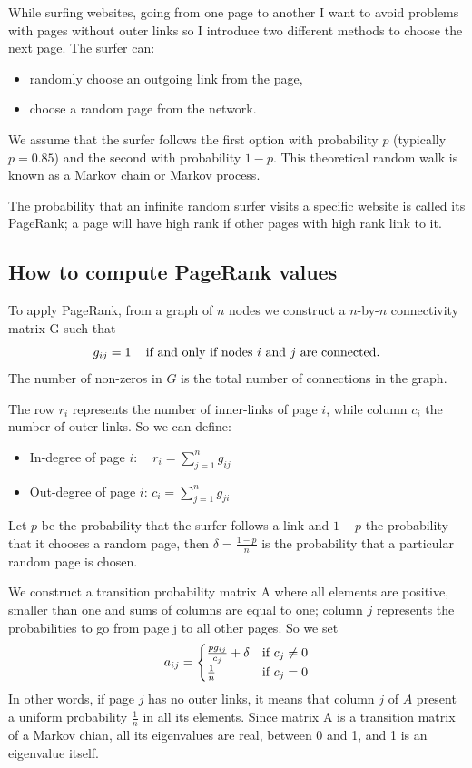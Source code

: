 \documentclass[]{usiinfbachelorproject}
\newcommand\tab[1][1cm]{\hspace*{#1}}
\begin{document}
While surfing websites, going from one page to another I want to avoid problems with pages without outer links so I introduce two different methods to choose the next page. The surfer can:
\begin{itemize}
\item randomly choose an outgoing link from the page,
\item choose a random page from the network.
\end{itemize}
We assume that the surfer follows the first option with probability $p$ (typically $p=0.85$) and the second with probability $1-p$. This theoretical random walk is known as a Markov chain or Markov process.

The probability that an infinite random surfer visits a specific website is called its PageRank; a page will have high rank if other pages with high rank link to it.


\subsection{How to compute PageRank values}
To apply PageRank, from a graph of $n$ nodes we construct a $n$-by-$n$ connectivity matrix G such that
\begin{equation*}
g_{ij}=1 \text{\;\;\; if and only if nodes $i$ and $j$ are connected.} 
\end{equation*}
The number of non-zeros in $G$ is the total number of connections in the graph.

The row $r_i$ represents the number of inner-links of page $i$, while column $c_i$ the number of outer-links. So we can define:
\begin{itemize}
\item In-degree of page $i$: \tab $\:\:\:\:r_i = \sum\limits_{j=1}^{n} g_{ij}$
\item Out-degree of page $i$: \tab $c_i = \sum\limits_{j=1}^{n} g_{ji}$
\end{itemize}
Let $p$ be the probability that the surfer follows a link and $1-p$ the probability that it chooses a random page, then $\delta = \frac{1-p}{n}$ is the probability that a particular random page is chosen.

We construct a transition probability matrix A where all elements are positive, smaller than one and sums of columns are equal to one; column $j$ represents the probabilities to go from page j to all other pages. So we set
\begin{equation}\notag
a_{ij} = 
\begin{cases}
\frac{pg_{ij}}{c_{j}} + \delta  & \text{if } c_{j} \neq 0\\
\frac{1}{n} & \text{if } c_{j} = 0
\end{cases}
\end{equation}
In other words, if page $j$ has no outer links, it means that column $j$ of $A$ present a uniform probability $\frac{1}{n}$ in all its elements. Since matrix A is a transition matrix of a Markov chian, all its eigenvalues are real, between 0 and 1, and 1 is an eigenvalue itself. 
\end{document}
